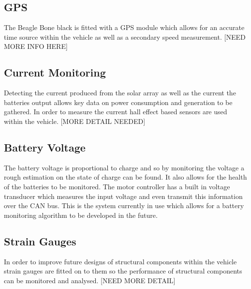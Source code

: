 \documentclass[10pt,a4paper]{article}
\begin{document}
\subsection{GPS}
The Beagle Bone black is fitted with a GPS module which allows for an accurate time source within the vehicle as well as a secondary speed measurement. [NEED MORE INFO HERE]

\subsection{Current Monitoring}
Detecting the current produced from the solar array as well as the current the batteries output allows key data on power consumption and generation to be gathered. In order to measure the current hall effect based sensors are used within the vehicle. [MORE DETAIL NEEDED]

\subsection{Battery Voltage}

The battery voltage is proportional to charge and so by monitoring the voltage a rough estimation on the state of charge can be found. It also allows for the health of the batteries to be monitored. The motor controller has a built in voltage transducer which measures the input voltage and even transmit this information over the CAN bus. This is the system currently in use which allows for a battery monitoring algorithm to be developed in the future.

\subsection{Strain Gauges}
In order to improve future designs of structural components within the vehicle strain gauges are fitted on to them so the performance of structural components can be monitored and analysed. [NEED MORE DETAIL]
\end{document}
